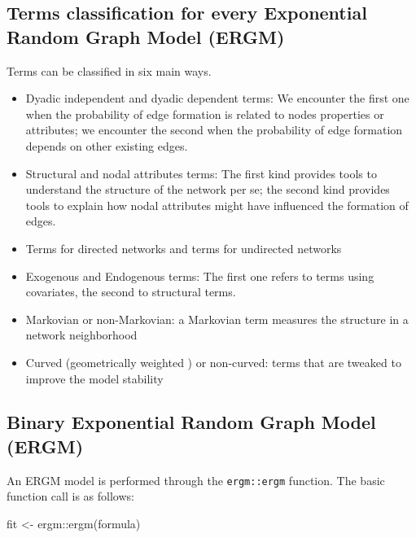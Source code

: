 \documentclass[
]{article}
\newenvironment{Shaded}{\begin{snugshade}}{\end{snugshade}}
\newcommand{\FunctionTok}[1]{\textcolor[rgb]{0.00,0.00,0.00}{#1}}
\newcommand{\NormalTok}[1]{#1}
\newcommand{\OtherTok}[1]{\textcolor[rgb]{0.56,0.35,0.01}{#1}}
\newcommand{\SpecialCharTok}[1]{\textcolor[rgb]{0.00,0.00,0.00}{#1}}
\begin{document}
\hypertarget{terms-classification-for-every-exponential-random-graph-model-ergm}{%
\subsection{Terms classification for every Exponential Random Graph
Model
(ERGM)}\label{terms-classification-for-every-exponential-random-graph-model-ergm}}

Terms can be classified in six main ways.

\begin{itemize}
\item
  Dyadic independent and dyadic dependent terms: We encounter the first
  one when the probability of edge formation is related to nodes
  properties or attributes; we encounter the second when the probability
  of edge formation depends on other existing edges.
\item
  Structural and nodal attributes terms: The first kind provides tools
  to understand the structure of the network per se; the second kind
  provides tools to explain how nodal attributes might have influenced
  the formation of edges.
\item
  Terms for directed networks and terms for undirected networks
\item
  Exogenous and Endogenous terms: The first one refers to terms using
  covariates, the second to structural terms.
\item
  Markovian or non-Markovian: a Markovian term measures the structure in
  a network neighborhood
\item
  Curved (geometrically weighted ) or non-curved: terms that are tweaked
  to improve the model stability
\end{itemize}

\hypertarget{binary-exponential-random-graph-model-ergm}{%
\subsection{Binary Exponential Random Graph Model
(ERGM)}\label{binary-exponential-random-graph-model-ergm}}

An ERGM model is performed through the \texttt{ergm::ergm} function. The
basic function call is as follows:

\begin{Shaded}
\begin{Highlighting}[]
\NormalTok{fit }\OtherTok{\textless{}{-}}\NormalTok{ ergm}\SpecialCharTok{::}\FunctionTok{ergm}\NormalTok{(formula)}
\end{Highlighting}
\end{Shaded}
\end{document}
